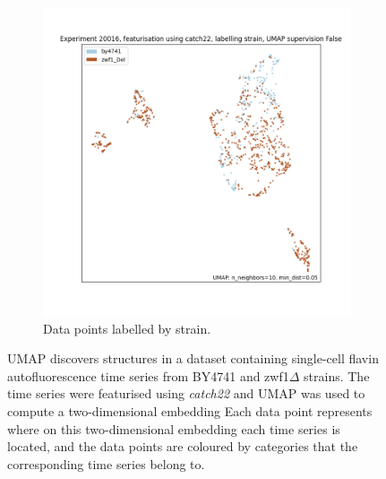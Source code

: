 \begin{figure}
  \begin{subfigure}[t]{0.7\textwidth}
  \centering
    \includegraphics[width=\linewidth]{Figure_13}
    \caption{
      Data points labelled by strain.
    }
    \label{fig:umap-strain}
  \end{subfigure}

  \caption{
    UMAP discovers structures in a dataset containing single-cell flavin autofluorescence time series from BY4741 and zwf1$\Delta$ strains.
    The time series were featurised using \textit{catch22} and UMAP was used to compute a two-dimensional embedding
    Each data point represents where on this two-dimensional embedding each time series is located, and the data points are coloured by categories that the corresponding time series belong to.
  }
  \label{fig:umap}
\end{figure}

